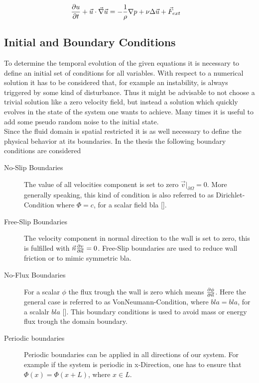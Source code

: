 \begin{align}
    \pdn[u]{t} + \vec{u} \cdot \vec{\nabla} \vec{u} &= - \frac{1}{\rho} \nabla p + \nu \Delta \vec{u} + \vec{F}_{ext}
\end{align}


\subsection{Initial and Boundary Conditions}

To determine the temporal evolution of the given equations it is necessary to define an initial set of conditions for all variables.
With respect to a numerical solution it has to be considered that, for example an instability, is always triggered by some kind of disturbance.
Thus it might be advisable to not choose a trivial solution like a zero velocity field, but instead a solution which quickly evolves in the state
of the system one wants to achieve. Many times it is useful to add some pseudo random noise to the initial state.\\
Since the fluid domain is spatial restricted it is as well necessary to define the physical behavior at its boundaries.
In the thesis the following boundary conditions are considered


\begin{description}
    \item[No-Slip Boundaries] The value of all velocities component is set to zero $\vec{v}|_{\partial \Omega} = 0$.
                              More generally speaking, this kind of condition is  also referred to as Dirichlet-Condition where $\Phi=c $, for a scalar field bla [].
    \item[Free-Slip Boundaries] The velocity component in normal direction to the wall is set to zero, this is fulfilled with $\vec{n}\pdn[v]{\vec{n}} = 0$.
                                Free-Slip boundaries are used to reduce wall friction or to mimic symmetric bla.
    \item[No-Flux Boundaries] For a scalar $\phi$ the flux trough the wall is zero which means $\pdn[\phi]{\vec{n}}$.
                              Here the general case is referred to as VonNeumann-Condition, where $bla=bla$, for a scalalr $bla$  [].
                              This boundary conditions is used to avoid mass or energy flux trough the domain boundary.
    \item[Periodic boundaries] Periodic boundaries can be applied in all directions of our system. For example if the system is periodic in x-Direction,
                                one has to ensure that $\Phi(x) = \Phi(x + L)$, where $x \in L$.

\end{description}

